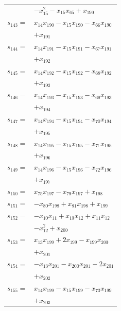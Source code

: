 \begin{longtable}{@{}r@{\;}l@{}}
 & \(\displaystyle -x_{15}^{2} -x_{15}x_{65} +x_{190}\) \\[3pt]
\(s_{143}=\) & \(\displaystyle x_{14}x_{190} -x_{15}x_{190} -x_{66}x_{190}\) \\
 & \(\displaystyle +x_{191}\) \\[3pt]
\(s_{144}=\) & \(\displaystyle x_{14}x_{191} -x_{15}x_{191} -x_{67}x_{191}\) \\
 & \(\displaystyle +x_{192}\) \\[3pt]
\(s_{145}=\) & \(\displaystyle x_{14}x_{192} -x_{15}x_{192} -x_{68}x_{192}\) \\
 & \(\displaystyle +x_{193}\) \\[3pt]
\(s_{146}=\) & \(\displaystyle x_{14}x_{193} -x_{15}x_{193} -x_{69}x_{193}\) \\
 & \(\displaystyle +x_{194}\) \\[3pt]
\(s_{147}=\) & \(\displaystyle x_{14}x_{194} -x_{15}x_{194} -x_{70}x_{194}\) \\
 & \(\displaystyle +x_{195}\) \\[3pt]
\(s_{148}=\) & \(\displaystyle x_{14}x_{195} -x_{15}x_{195} -x_{71}x_{195}\) \\
 & \(\displaystyle +x_{196}\) \\[3pt]
\(s_{149}=\) & \(\displaystyle x_{14}x_{196} -x_{15}x_{196} -x_{72}x_{196}\) \\
 & \(\displaystyle +x_{197}\) \\[3pt]
\(s_{150}=\) & \(\displaystyle x_{75}x_{197} -x_{79}x_{197} +x_{198}\) \\[3pt]
\(s_{151}=\) & \(\displaystyle -x_{80}x_{198} +x_{81}x_{198} +x_{199}\) \\[3pt]
\(s_{152}=\) & \(\displaystyle -x_{10}x_{11} +x_{10}x_{12} +x_{11}x_{12}\) \\
 & \(\displaystyle -x_{12}^{2} +x_{200}\) \\[3pt]
\(s_{153}=\) & \(\displaystyle x_{13}x_{199} +2x_{199} -x_{199}x_{200}\) \\
 & \(\displaystyle +x_{201}\) \\[3pt]
\(s_{154}=\) & \(\displaystyle -x_{13}x_{201} -x_{200}x_{201} -2x_{201}\) \\
 & \(\displaystyle +x_{202}\) \\[3pt]
\(s_{155}=\) & \(\displaystyle x_{14}x_{199} -x_{15}x_{199} -x_{73}x_{199}\) \\
 & \(\displaystyle +x_{203}\) \\[3pt]
\end{longtable}
\endgroup
